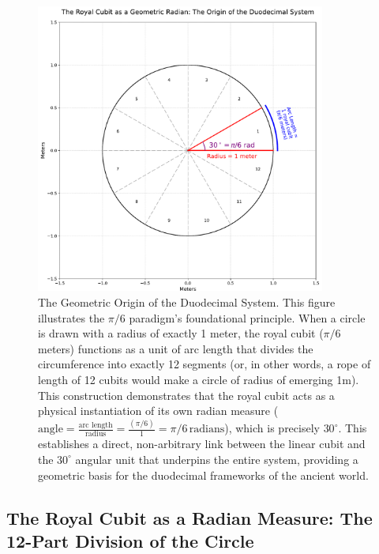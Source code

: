 \documentclass[11pt]{article}
\begin{document}
\begin{figure}[htbp]
\centering
\includegraphics[width=0.85\textwidth]{figures/radian.pdf}
\caption{The Geometric Origin of the Duodecimal System. This figure illustrates the $\pi/6$ paradigm's foundational principle. When a circle is drawn with a radius of exactly 1 meter, the royal cubit ($\pi/6$ meters) functions as a unit of arc length that divides the circumference into exactly 12 segments (or, in other words, a rope of length of 12 cubits would make a circle of radius of emerging 1m). This construction demonstrates that the royal cubit acts as a physical instantiation of its own radian measure ($\text{angle} = \frac{\text{arc length}}{\text{radius}} = \frac{(\pi/6)}{1} = \pi/6\,\text{radians}$), which is precisely $30^\circ$. This establishes a direct, non-arbitrary link between the linear cubit and the $30^\circ$ angular unit that underpins the entire system, providing a geometric basis for the duodecimal frameworks of the ancient world.}
\label{fig:radian_origin}
\end{figure}

\subsection{The Royal Cubit as a Radian Measure: The 12-Part Division of the Circle}
\end{document}
